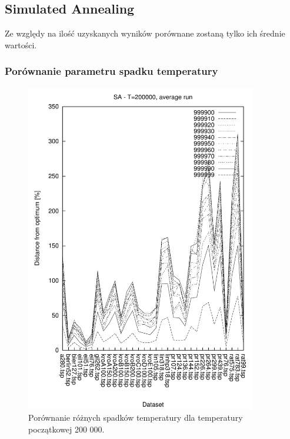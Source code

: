 \subsection{Simulated Annealing}

\it

Ze względy na ilość uzyskanych wyników porównane zostaną tylko ich średnie wartości.

\rm

\subsubsection{Porównanie parametru spadku temperatury}



\begin{figure}
\begin{center}
\includegraphics[width=0.9\textwidth]{wykresy/sa/sa_200000_av}
\end{center}
\caption{Porównanie różnych spadków temperatury dla temperatury początkowej 200 000.}
\label{sa_200000_av}
\end{figure}

